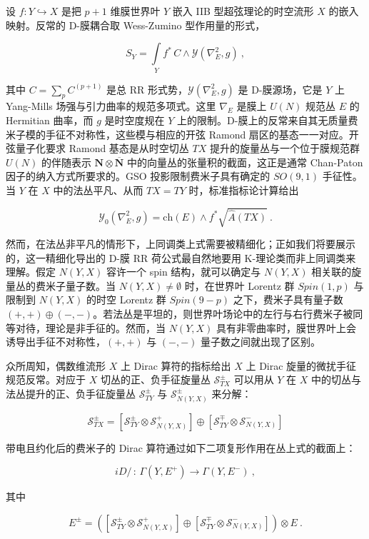 \documentclass[11pt,a4paper]{ctexart}
\begin{document}
设 \(f:Y\hookrightarrow X\) 是把 \(p+1\) 维膜世界叶 \(Y\) 嵌入 IIB 型超弦理论的时空流形 \(X\) 的嵌入映射。反常的 D-膜耦合取 Wess-Zumino 型作用量的形式，

\[S_Y=\int\limits_Yf^*\,C\wedge {\mathcal Y}(\nabla_E^2,g)\ ,\]

其中 \(C=\sum_pC^{(p+1)}\) 是总 RR 形式势，\({\mathcal Y}(\nabla_E^2,g)\) 是 D-膜源场，它是 \(Y\) 上 Yang-Mills 场强与引力曲率的规范多项式。这里 \(\nabla_E\) 是膜上 \(U(N)\) 规范丛 \(E\) 的 Hermitian 曲率，而 \(g\) 是时空度规在 \(Y\) 上的限制。D-膜上的反常来自其无质量费米子模的手征不对称性，这些模与相应的开弦 Ramond 扇区的基态一一对应。开弦量子化要求 Ramond 基态是从时空切丛 \(TX\) 提升的旋量丛与一个位于膜规范群 \(U(N)\) 的伴随表示 \({\mathbf N}\otimes\overline{\mathbf N}\) 中的向量丛的张量积的截面，这正是通常 Chan-Paton 因子的纳入方式所要求的。GSO 投影限制费米子具有确定的 \(SO(9,1)\) 手征性。当 \(Y\) 在 \(X\) 中的法丛平凡、从而 \(TX=TY\) 时，标准指标论计算给出

\[{\mathcal Y}_0(\nabla_E^{2},g)=\mathrm{ch}(E)\wedge f^*\sqrt{\widehat{A}(TX)}\ .\]

然而，在法丛非平凡的情形下，上同调类上式需要被精细化；正如我们将要展示的，这一精细化导出的 D-膜 RR 荷公式最自然地要用 K-理论类而非上同调类来理解。假定 \(N(Y,X)\) 容许一个 spin 结构，就可以确定与 \(N(Y,X)\) 相关联的旋量丛的费米子量子数。当 \(N(Y,X)\neq \emptyset\) 时，在世界叶 Lorentz 群 \(Spin(1,p)\) 与限制到 \(N(Y,X)\) 的时空 Lorentz 群 \(Spin(9-p)\) 之下，费米子具有量子数 \((+,+)\oplus(-,-)\)。若法丛是平坦的，则世界叶场论中的左行与右行费米子被同等对待，理论是非手征的。然而，当 \(N(Y,X)\) 具有非零曲率时，膜世界叶上会诱导出手征不对称性，\((+,+)\) 与 \((-,-)\) 量子数之间就出现了区别。

众所周知，偶数维流形 \(X\) 上 Dirac 算符的指标给出 \(X\) 上 Dirac 旋量的微扰手征规范反常。对应于 \(X\) 切丛的正、负手征旋量丛 \({\mathcal S}_{TX}^{\pm}\) 可以用从 \(Y\) 在 \(X\) 中的切丛与法丛提升的正、负手征旋量丛 \({\mathcal S}_{TY}^{\pm}\) 与 \({\mathcal S}_{N(Y,X)}^{\pm}\) 来分解：

\[{\mathcal S}_{TX}^{\pm}=\left[{\mathcal S}_{TY}^{\pm}\otimes
{\mathcal S}_{N(Y,X)}^{+}
\right]\oplus\left[{\mathcal S}_{TY}^{\mp}\otimes
{\mathcal S}_{N(Y,X)}^{-}\right]\]

带电且约化后的费米子的 Dirac 算符通过如下二项复形作用在丛上式的截面上：

\[iD/\,:\, \Gamma(Y,E^+)\longrightarrow \Gamma(Y,E^-)\ ,\]

其中

\[E^{\pm}=\left(\left[{\mathcal S}_{TY}^{\pm}\otimes
{\mathcal S}_{N(Y,X)}^{+}\right]\oplus\left[{\mathcal S}_{TY}^{\mp}\otimes
{\mathcal S}_{N(Y,X)}^{-}\right]\right)\otimes E\ .\]
\end{document}

